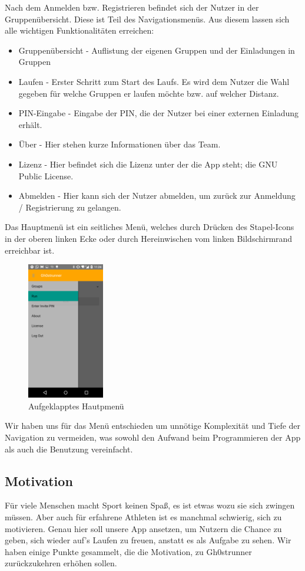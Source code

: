 Nach dem Anmelden bzw. Registrieren befindet sich der Nutzer in der Gruppenübersicht. Diese ist Teil des Navigationsmenüs. Aus diesem lassen sich alle wichtigen Funktionalitäten erreichen:
\begin{itemize}
\item Gruppenübersicht - Auflistung der eigenen Gruppen und der Einladungen in Gruppen
\item Laufen - Erster Schritt zum Start des Laufs. Es wird dem Nutzer die Wahl gegeben für welche Gruppen er laufen möchte bzw. auf welcher Distanz.
\item PIN-Eingabe - Eingabe der PIN, die der Nutzer bei einer externen Einladung erhält.
\item Über - Hier stehen kurze Informationen über das Team.
\item Lizenz - Hier befindet sich die Lizenz unter der die App steht; die GNU Public License. 
\item Abmelden - Hier kann sich der Nutzer abmelden, um zurück zur Anmeldung / Registrierung zu gelangen.
\end{itemize}

Das Hauptmenü ist ein seitliches Menü, welches durch Drücken des Stapel-Icons in der oberen linken Ecke oder durch Hereinwischen vom linken Bildschirmrand erreichbar ist.
\begin{figure}[!h]
\centering
\includegraphics[width=0.3\textwidth]{abb/bsp/bsp7}
\caption{Aufgeklapptes Hautpmenü}
\end{figure}

Wir haben uns für das Menü entschieden um unnötige Komplexität und Tiefe der Navigation zu vermeiden, was sowohl den Aufwand beim Programmieren der App als auch die Benutzung vereinfacht.
\subsection{Motivation}
Für viele Menschen macht Sport keinen Spaß, es ist etwas wozu sie sich zwingen müssen. Aber auch für erfahrene Athleten ist es manchmal schwierig, sich zu motivieren. Genau hier soll unsere App ansetzen, um Nutzern die Chance zu geben, sich wieder auf's Laufen zu freuen, anstatt es als Aufgabe zu sehen. Wir haben einige Punkte gesammelt, die die Motivation, zu Gh0strunner zurückzukehren erhöhen sollen.

